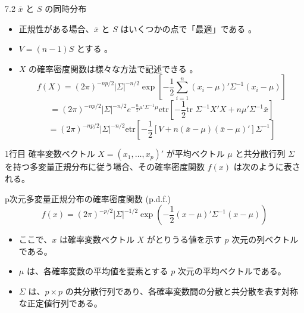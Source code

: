 \documentclass{beamer}
\begin{document}
\begin{frame}{7.2 $\bar{x}$ と $S$ の同時分布}
\begin{itemize}
    \item 正規性がある場合、$\bar{x}$ と $S$ はいくつかの点で「最適」である 。
    \item $V=(n-1)S$ とする 。
    \item $X$ の確率密度関数は様々な方法で記述できる 。
    \begin{equation*}
    f(X) = (2\pi)^{-np/2} |\Sigma|^{-n/2} \exp\left[-\frac{1}{2} \sum_{i=1}^{n} (x_i - \mu)' \Sigma^{-1} (x_i - \mu)\right] \tag{7.1}
    \end{equation*}
    \begin{equation*}
    = (2\pi)^{-np/2} |\Sigma|^{-n/2} e^{-\frac{n}{2}\mu'\Sigma^{-1}\mu} \text{etr}\left[-\frac{1}{2}\text{tr }\Sigma^{-1}X'X + n\mu'\Sigma^{-1}\bar{x}\right] 
    \end{equation*}
    \begin{equation*}
    = (2\pi)^{-np/2} |\Sigma|^{-n/2} \text{etr}\left[-\frac{1}{2}[V + n(\bar{x} - \mu)(\bar{x} - \mu)']\Sigma^{-1}\right] 
    \end{equation*}
\end{itemize}
\end{frame}

\begin{frame}{1行目}
確率変数ベクトル $X = (x_1, \dots, x_p)'$ が平均ベクトル $\mu$ と共分散行列 $\Sigma$ を持つ多変量正規分布に従う場合、その確率密度関数 $f(x)$ は次のように表される。
\begin{theorem}{p次元多変量正規分布の確率密度関数 (p.d.f.)}
\begin{equation*}
f(x) = (2\pi)^{-p/2} |\Sigma|^{-1/2} \exp\left(-\frac{1}{2}(x - \mu)'\Sigma^{-1}(x - \mu)\right)
\end{equation*}
\end{theorem}
\begin{itemize}
\item ここで、$x$ は確率変数ベクトル $X$ がとりうる値を示す $p$ 次元の列ベクトルである。
\item $\mu$ は、各確率変数の平均値を要素とする $p$ 次元の平均ベクトルである。
\item $\Sigma$ は、$p \times p$ の共分散行列であり、各確率変数間の分散と共分散を表す対称な正定値行列である。
\end{itemize}
\end{frame}
\end{document}
